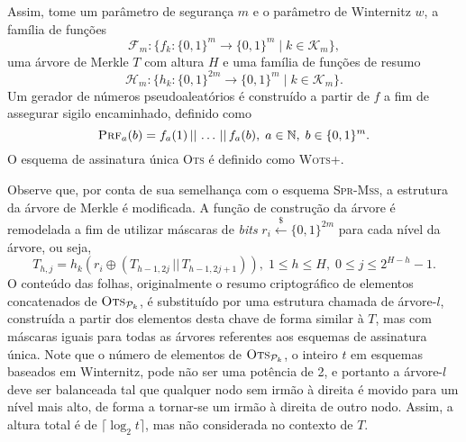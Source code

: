\documentclass{ufsctex/ufsctex}
\newcommand{\hh}{\mathcal{H}}
\newcommand{\pk}{\mathcal{P}_{k}}
\newcommand{\concat}{\, \vert{} \vert{} \,}
\newcommand{\binwds}[1]{\{0, 1\}^{#1}}
\newcommand{\random}{\stackrel{\$}{\longleftarrow}}
\newcommand{\wotsplus}{\textsc{Wots+}}
\newcommand{\sprmss}{\textsc{Spr-Mss}}
\begin{document}
Assim, tome um parâmetro de segurança $m$ e o parâmetro de Winternitz $w$, a
família de funções \[\mathcal{F}_{m} : \{f_{k} : \binwds{m} \longrightarrow
\binwds{m} \mid k \in \mathcal{K}_{m}\},\] uma árvore de Merkle $T$ com altura
$H$ e uma família de funções de resumo \[\hh{}_{m} : \{h_{k} : \binwds{2m}
\longrightarrow \binwds{m} \mid k \in \mathcal{K}_{m}\}.\] Um gerador de
números pseudoaleatórios é construído a partir de $f$ a fim de assegurar sigilo
encaminhado, definido como
\begin{equation}
  \textsc{Prf}_{a}(b) = f_{a}(1) \concat \dots \concat f_{a}(b),
    \; a \in \mathbb{N}, \; b \in \binwds{m}.
\end{equation}
O esquema de assinatura única \textsc{Ots} é definido como \wotsplus{}.

Observe que, por conta de sua semelhança com o esquema \sprmss{}, a estrutura
da árvore de Merkle é modificada. A função de construção da árvore é remodelada
a fim de utilizar máscaras de \emph{bits} $r_{i} \random{}
\binwds{2m}$ para cada nível da árvore, ou seja,
\begin{equation}
  T_{h, j} = h_{k}(r_{i} \oplus (T_{h - 1, 2j} \concat T_{h - 1, 2j + 1})),
    \; 1 \leq h \leq H, \; 0 \leq j \leq 2^{H - h} - 1.
\end{equation}
O conteúdo das folhas, originalmente o resumo criptográfico de elementos
concatenados de $\textsc{Ots}_{\pk{}}$, é substituído por uma estrutura chamada
de árvore-$l$, construída a partir dos elementos desta chave de forma similar à
$T$, mas com máscaras iguais para todas as árvores referentes aos esquemas de
assinatura única. Note que o número de elementos de $\textsc{Ots}_{\pk{}}$, o
inteiro $t$ em esquemas baseados em Winternitz, pode não ser uma potência de 2,
e portanto a árvore-$l$ deve ser balanceada tal que qualquer nodo sem irmão à
direita é movido para um nível mais alto, de forma a tornar-se um irmão à
direita de outro nodo. Assim, a altura total é de $\lceil \log_{2} t \rceil$,
mas não considerada no contexto de $T$.
\end{document}
